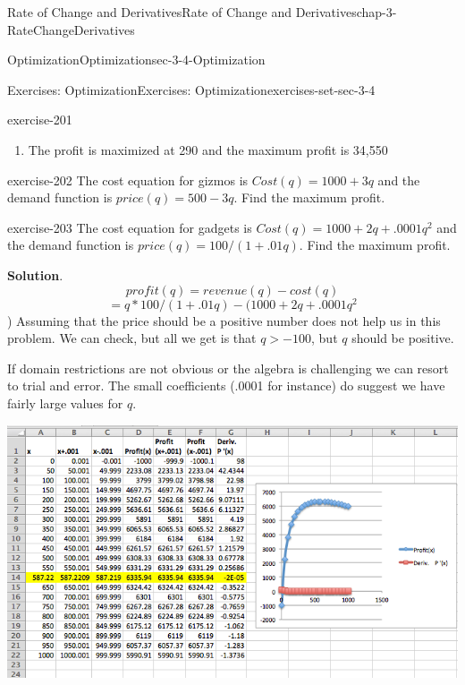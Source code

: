 \documentclass[oneside,10pt,]{book}
\numberwithin{equation}{section}
\newcommand{\gt}{>}
\begin{document}
\begin{chapterptx}{Rate of Change and Derivatives}{}{Rate of Change and Derivatives}{}{}{chap-3-RateChangeDerivatives}
\begin{sectionptx}{Optimization}{}{Optimization}{}{}{sec-3-4-Optimization}
\begin{exercises-subsection-numberless}{Exercises: Optimization}{}{Exercises: Optimization}{}{}{exercises-set-sec-3-4}
\begin{divisionexercise}{11}{}{}{exercise-201}
\begin{enumerate}[label=(\alph*)]
%
\item\hypertarget{li-417}{}\hypertarget{p-1304}{}%
The profit is maximized at 290 and the maximum profit is \textdollar{}34,550%
\end{enumerate}
\end{divisionexercise}%
\begin{divisionexercise}{12}{}{}{exercise-202}%
\hypertarget{p-1305}{}%
The cost equation for gizmos is \(Cost(q)=1000+3q\) and the demand function is \(price(q)=500-3q\).  Find the maximum profit.%
\end{divisionexercise}%
\begin{divisionexercise}{13}{}{}{exercise-203}%
\hypertarget{p-1306}{}%
The cost equation for gadgets is \(Cost(q)=1000+2q+.0001q^2\) and the demand function is \(price(q)=100/(1+.01q)\).  Find the maximum profit.%
\par\smallskip%
\noindent\textbf{Solution}.\hypertarget{solution-101}{}\quad%
%
\begin{equation*}
profit(q)=revenue(q)- cost(q)
\end{equation*}
%
\begin{equation*}
=q*100/(1+.01q)- (1000+2q+.0001q^2
\end{equation*}
) \hypertarget{p-1307}{}%
Assuming that the price should be a positive number does not help us in this problem. We can check, but all we get is that \(q \gt -100\), but \(q\) should be positive.%
\par
\hypertarget{p-1308}{}%
If domain restrictions are not obvious or the algebra is challenging we can resort to trial and error.  The small coefficients (.0001 for instance) do suggest we have fairly large values for \(q\).%
\begin{sidebyside}{1}{0.1}{0.1}{0}%
\begin{sbspanel}{0.8}%
\includegraphics[width=1\linewidth]{images/sec3-4-sol13a.png}

\end{sbspanel}
\end{sidebyside}
\end{divisionexercise}
\end{exercises-subsection-numberless}
\end{sectionptx}
\end{chapterptx}
\end{document}
